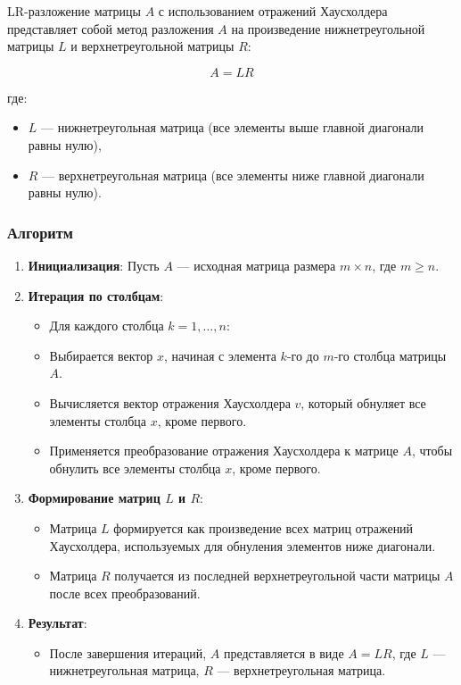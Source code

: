 \documentclass{article}
\begin{document}
LR-разложение матрицы \( A \) с использованием отражений Хаусхолдера представляет собой метод разложения \( A \) на произведение нижнетреугольной матрицы \( L \) и верхнетреугольной матрицы \( R \):

\[ A = LR \]

где:
\begin{itemize}
  \item \( L \) — нижнетреугольная матрица (все элементы выше главной диагонали равны нулю),
  \item \( R \) — верхнетреугольная матрица (все элементы ниже главной диагонали равны нулю).
\end{itemize}

\subsubsection{Алгоритм}

\begin{enumerate}
  \item \textbf{Инициализация}: Пусть \( A \) — исходная матрица размера \( m \times n \), где \( m \geq n \).
  
  \item \textbf{Итерация по столбцам}:
    \begin{itemize}
      \item Для каждого столбца \( k = 1, \ldots, n \):
      \item Выбирается вектор \( x \), начиная с элемента \( k \)-го до \( m \)-го столбца матрицы \( A \).
      \item Вычисляется вектор отражения Хаусхолдера \( v \), который обнуляет все элементы столбца \( x \), кроме первого.
      \item Применяется преобразование отражения Хаусхолдера к матрице \( A \), чтобы обнулить все элементы столбца \( x \), кроме первого.
    \end{itemize}
  
  \item \textbf{Формирование матриц \( L \) и \( R \)}:
    \begin{itemize}
      \item Матрица \( L \) формируется как произведение всех матриц отражений Хаусхолдера, используемых для обнуления элементов ниже диагонали.
      \item Матрица \( R \) получается из последней верхнетреугольной части матрицы \( A \) после всех преобразований.
    \end{itemize}
  
  \item \textbf{Результат}:
    \begin{itemize}
      \item После завершения итераций, \( A \) представляется в виде \( A = LR \), где \( L \) — нижнетреугольная матрица, \( R \) — верхнетреугольная матрица.
    \end{itemize}
\end{enumerate}
\end{document}
